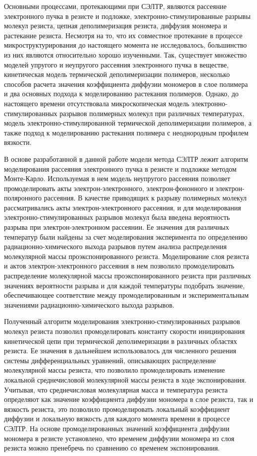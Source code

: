 Основными процессами, протекающими при СЭЛТР, являются рассеяние электронного пучка в резисте и подложке, электронно-стимулированные разрывы молекул резиста, цепная деполимеризация резиста, диффузия мономера и растекание резиста. Несмотря на то, что их совместное протекание в процессе микроструктурирования до настоящего момента не исследовалось, большинство из них являются относительно хорошо изученными. Так, существует множество моделей упругого и неупругого рассеяния электронного пучка в веществе, кинетическая модель термической деполимеризации полимеров, несколько способов расчета значения коэффициента диффузии мономеров в слое полимера и два основных подхода к моделированию растекания полимеров. Однако, до настоящего времени отсутствовала микроскопическая модель электронно-стимулированных разрывов полимерных молекул при различных температурах, модель электронно-стимулированной термической деполимеризации полимеров, а также подход к моделированию растекания полимера с неоднородным профилем вязкости.

В основе разработанной в данной работе модели метода СЭЛТР лежит алгоритм моделирования рассеяния электронного пучка в резисте и подложке методом Монте-Карло. Используемая в нем модель неупругого рассеяния позволяет промоделировать акты электрон-электронного, электрон-фононного и электрон-поляронного рассеяния. В качестве приводящих к разрыву полимерных молекул рассматривались акты электрон-электронного рассеяния, и для моделирования электронно-стимулированных разрывов молекул была введена вероятность разрыва при электрон-электронном рассеянии. Ее значения для различных температур были найдены за счет моделирования эксперимента по определению радиационно-химического выхода разрывов путем анализа распределения молекулярной массы проэкспонированного резиста. Моделирование слоя резиста и актов электрон-электронного рассеяния в нем позволило промоделировать распределение молекулярной массы проэкспонированного резиста при различных значениях вероятности разрыва и для каждой температуры подобрать значение, обеспечивающее соответствие между промоделированным и экспериментальным значениями радиационно-химического выхода разрывов.

Полученный алгоритм моделирования электронно-стимулированных разрывов молекул резиста позволил промоделировать константу скорости инициирования кинетической цепи при термической деполимеризации в различных областях резиста. Ее значения в дальнейшем использовалось для численного решения системы дифференциальных уравнений, описывающих распределение молекулярной массы резиста, что позволило промоделировать изменение локальной среднечисловой молекулярной массы резиста в ходе экспонирования. Учитывая, что среднечисловая молекулярная масса и температура резиста определяют как значение коэффициента диффузии мономера в слое резиста, так и вязкость резиста, это позволило промоделировать локальный коэффициент диффузии и локальную вязкость для каждого момента времени в процессе СЭЛТР. На основе промоделированных значений коэффициента диффузии мономера в резисте установлено, что временем диффузии мономера из слоя резиста можно пренебречь по сравнению со временем экспонирования.

